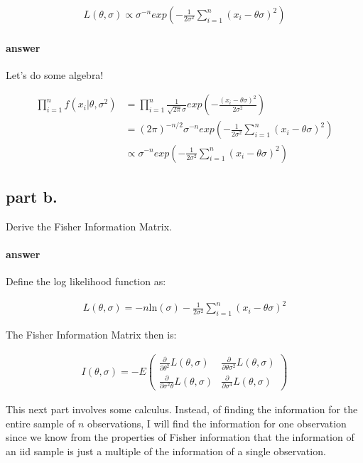\documentclass[12pt,a4paper]{article}
\begin{document}
\begin{align*}
	L(\theta, \sigma) \propto \sigma^{-n} exp \left(-\frac{1}{2\sigma^2} \sum_{i=1}^{n} (x_i - \theta\sigma)^2 \right)
\end{align*}

\paragraph{answer} Let's do some algebra!

\begin{align*}
	\prod_{i=1}^n f(x_i | \theta, \sigma^2) &= \prod_{i=1}^n \frac{1}{\sqrt{2\pi}\sigma} exp \left(- \frac{(x_i - \theta\sigma)^2}{2\sigma^2}\right) \\
											&= (2\pi)^{-n/2} \sigma^{-n} exp \left(- \frac{1}{2\sigma^2} \sum_{i=1}^n (x_i - \theta\sigma)^2\right) \\
											&\propto \sigma^{-n} exp \left(- \frac{1}{2\sigma^2} \sum_{i=1}^n (x_i - \theta\sigma)^2\right)
\end{align*}

\subsection{part b.}
Derive the Fisher Information Matrix.

\paragraph{answer} Define the log likelihood function as:

\begin{align*}
	L(\theta, \sigma) = -n \text{ln}(\sigma) - \frac{1}{2\sigma^2} \sum_{i=1}^{n} (x_i - \theta\sigma)^2
\end{align*}

The Fisher Information Matrix then is:

\begin{align*}
	I(\theta, \sigma) = -E
		\begin{pmatrix}
			\frac{\partial}{\partial \theta^2} L(\theta, \sigma) & \frac{\partial}{\partial \theta\sigma^2} L(\theta, \sigma) \\
			\frac{\partial}{\partial \sigma^2\theta} L(\theta, \sigma) & \frac{\partial}{\partial \sigma^4} L(\theta, \sigma)
		\end{pmatrix}	
\end{align*}

This next part involves some calculus.
Instead, of finding the information for the entire sample of $n$ observations, I will find the information for one observation since we know from the properties of Fisher information that the information of an iid sample is just a multiple of the information of a single observation.
\end{document}
